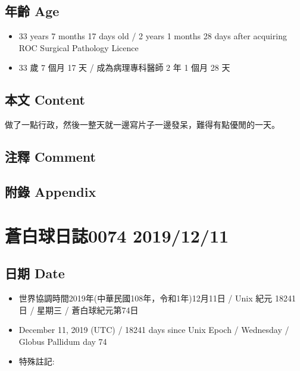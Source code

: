 \documentclass[a5paper, 12pt
]{book}
\providecommand{\tightlist}{%
  \setlength{\itemsep}{0pt}\setlength{\parskip}{0pt}}
\begin{document}
\hypertarget{ux5e74ux9f61-age-9}{%
\subsection{年齡 Age}\label{ux5e74ux9f61-age-9}}

\begin{itemize}
\tightlist
\item
  33 years 7 months 17 days old / 2 years 1 months 28 days after
  acquiring ROC Surgical Pathology Licence
\item
  33 歲 7 個月 17 天 / 成為病理專科醫師 2 年 1 個月 28 天
\end{itemize}

\hypertarget{ux672cux6587-content-9}{%
\subsection{本文 Content}\label{ux672cux6587-content-9}}

做了一點行政，然後一整天就一邊寫片子一邊發呆，難得有點優閒的一天。

\hypertarget{ux6ce8ux91cb-comment-9}{%
\subsection{注釋 Comment}\label{ux6ce8ux91cb-comment-9}}

\hypertarget{ux9644ux9304-appendix-9}{%
\subsection{附錄 Appendix}\label{ux9644ux9304-appendix-9}}

\hypertarget{ux84bcux767dux7403ux65e5ux8a8c0074-20191211}{%
\section{蒼白球日誌0074
2019/12/11}\label{ux84bcux767dux7403ux65e5ux8a8c0074-20191211}}

\hypertarget{ux65e5ux671f-date-10}{%
\subsection{日期 Date}\label{ux65e5ux671f-date-10}}

\begin{itemize}
\tightlist
\item
  世界協調時間2019年(中華民國108年，令和1年)12月11日 / Unix 紀元 18241
  日 / 星期三 / 蒼白球紀元第74日
\item
  December 11, 2019 (UTC) / 18241 days since Unix Epoch / Wednesday /
  Globus Pallidum day 74
\item
  特殊註記:
\end{itemize}
\end{document}
